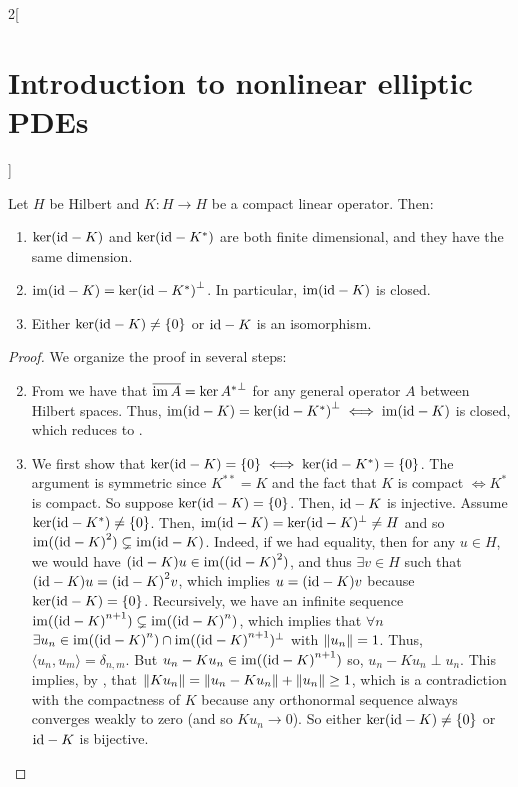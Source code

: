 \documentclass[../../../main_math.tex]{subfiles}
\begin{document}
\begin{multicols}{2}[\section{Introduction to nonlinear elliptic PDEs}]
  \begin{theorem}
    Let $H$ be Hilbert and $K:H\to H$ be a compact linear operator. Then:
    \begin{enumerate}
      \item $\ker(\mathrm{id}-K)$ and $\ker(\mathrm{id}-K^*)$ are both finite dimensional, and they have the same dimension.
      \item $\operatorname{im}(\mathrm{id}-K)={\ker(\mathrm{id}-K^*)}^\perp$. In particular, $\operatorname{im}(\mathrm{id}-K)$ is closed.
      \item Either $\ker(\mathrm{id}-K)\ne\{0\}$ or $\mathrm{id} -K$ is an isomorphism.
    \end{enumerate}
  \end{theorem}
  \begin{proof}
    We organize the proof in several steps:
    \begin{enumerate}
      \setcounter{enumi}{1}
      \item From  we have that $\overline{\operatorname{im} A}={\ker A^*}^\perp$ for any general operator $A$ between Hilbert spaces. Thus, $\operatorname{im}(\mathrm{id}-K)={\ker(\mathrm{id}-K^*)}^\perp\iff \operatorname{im}(\mathrm{id}-K)$ is closed, which reduces to .
      \item We first show that $\ker(\mathrm{id}-K)=\{0\}\iff \ker(\mathrm{id}-K^*)=\{0\}$. The argument is symmetric since $K^{**}=K$ and the fact that $K$ is compact $\iff K^*$ is compact. So suppose $\ker(\mathrm{id}-K)=\{0\}$. Then, $\mathrm{id} -K$ is injective. Assume $\ker(\mathrm{id}-K^*)\ne\{0\}$. Then, $\operatorname{im} (\mathrm{id}-K)=\ker(\mathrm{id}-K)^\perp\ne H$ and so $\operatorname{im}({(\mathrm{id}-K)}^2)\subsetneq \operatorname{im}(\mathrm{id}-K)$. Indeed, if we had equality, then for any $u\in H$, we would have ${(\mathrm{id}-K)u}\in \operatorname{im}({(\mathrm{id}-K)}^2)$, and thus $\exists v\in H$ such that ${(\mathrm{id}-K)u}={(\mathrm{id}-K)}^2v$, which implies $u={(\mathrm{id}-K)}v$ because $\ker (\mathrm{id}-K)=\{0\}$. Recursively, we have an infinite sequence $\operatorname{im}({(\mathrm{id}-K)}^{n+1})\subsetneq \operatorname{im}({(\mathrm{id}-K)}^n)$, which implies that $\forall n$ $\exists u_n\in \operatorname{im}({(\mathrm{id}-K)}^n)\cap\operatorname{im}({(\mathrm{id}-K)}^{n+1})^\perp$ with $\left\|u_n\right\|=1$. Thus, $\langle u_n,u_m\rangle=\delta_{n,m}$. But $u_n-Ku_n\in \operatorname{im}({(\mathrm{id}-K)}^{n+1})$ so, $u_n-Ku_n\perp u_n$. This implies, by , that $\left\|Ku_n\right\|=\left\|u_n-Ku_n\right\|+\left\|u_n\right\|\geq 1$, which is a contradiction with the compactness of $K$ because any orthonormal sequence always converges weakly to zero (and so $Ku_n\to 0$). So either $\ker(\mathrm{id}-K)\ne\{0\}$ or $\mathrm{id}-K$ is bijective.


\end{enumerate}
\end{proof}
\end{multicols}
\end{document}
